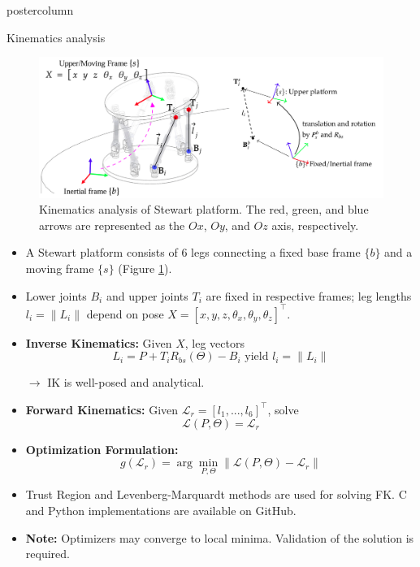 \documentclass{beamer}
\begin{document}
\begin{frame}
\begin{columns}
\begin{column}{.43\textwidth}
\begin{beamercolorbox}[center]{postercolumn}
\begin{minipage}{.98\textwidth}
{\begin{myblock}{Kinematics analysis}
\begin{figure}
\begin{minipage}{1\textwidth}
								\centering\includegraphics[width=\textwidth]{img/Kinematics.png}
								\caption{Kinematics analysis of Stewart platform. The red, green, and blue arrows are represented as the $Ox$, $Oy$, and $Oz$ axis, respectively.}
								\label{fig: kinematics}
							\end{minipage}
						\end{figure}
						\vspace{1em}
						\begin{itemize}
							\item A Stewart platform consists of 6 legs connecting a fixed base frame $\{b\}$ and a moving frame $\{s\}$ (Figure \ref{fig: kinematics}).
							\item Lower joints $B_i$ and upper joints $T_i$ are fixed in respective frames; leg lengths $l_i = \|L_i\|$ depend on pose $X = [x, y, z, \theta_x, \theta_y, \theta_z]^\top$.
							
							\item \textbf{Inverse Kinematics:} Given $X$, leg vectors
							\[
								L_i = P + T_i R_{bs}(\Theta) - B_i \text{ yield } l_i = \|L_i\|
							\]  
							
							$\to$ IK is well-posed and analytical.
							
							\item \textbf{Forward Kinematics:} Given $\mathcal{L}_r = [l_1, ..., l_6]^\top$, solve 
							\[\mathcal{L}(P, \Theta) = \mathcal{L}_r\]
							
							\item \textbf{Optimization Formulation:}
							\[
							g(\mathcal{L}_r) = \arg\min_{P, \Theta} \|\mathcal{L}(P, \Theta) - \mathcal{L}_r\|
							\]
							\item Trust Region and Levenberg-Marquardt methods are used for solving FK. C and Python implementations are available on GitHub.
							
							\item \textbf{Note:} Optimizers may converge to local minima. Validation of the solution is required.
							

\end{itemize}
\end{myblock}}
\end{minipage}
\end{beamercolorbox}
\end{column}
\end{columns}
\end{frame}
\end{document}
